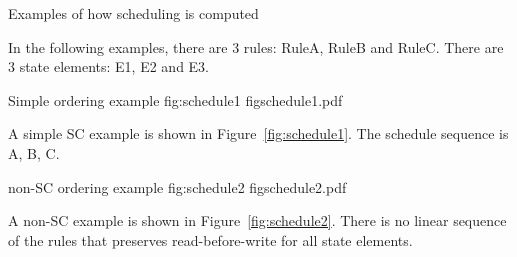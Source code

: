 
\pnum
Examples of how scheduling is computed

In the following examples, there are 3 rules: RuleA, RuleB and RuleC.
There are 3 state elements: E1, E2 and E3.

\begin{importgraphic}
{Simple ordering example}
{fig:schedule1}
{figschedule1.pdf}
\end{importgraphic}

A simple SC example is shown in Figure~\ref{fig:schedule1}.  
The schedule sequence is {A, B, C}.

\begin{importgraphic}
{non-SC ordering example}
{fig:schedule2}
{figschedule2.pdf}
\end{importgraphic}

A non-SC example is shown in Figure~\ref{fig:schedule2}.
There is no linear sequence of the rules that preserves read-before-write for all
state elements.
